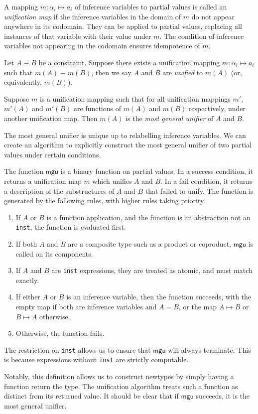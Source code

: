\documentclass[11pt]{book}
\begin{document}
\begin{defn}
  A mapping \( m: \alpha_i \mapsto a_i \) of inference variables to partial values is called an \textit{unification map} if the inference variables in the domain of \( m \) do not appear anywhere in its codomain.
  They can be applied to partial values, replacing all instances of that variable with their value under \( m \).
  The condition of inference variables not appearing in the codomain ensures idempotence of \( m \).

  Let \( A \equiv B \) be a constraint.
  Suppose there exists a unification mapping \( m: \alpha_i \mapsto a_i \) such that \( m(A) \equiv m(B) \), then we say \( A \) and \( B \) are \textit{unified} to \( m(A) \) (or, equivalently, \( m(B) \)).

  Suppose \( m \) is a unification mapping such that for all unification mappings \( m' \), \( m'(A) \) and \( m'(B) \) are functions of \( m(A) \) and \( m(B) \) respectively, under another unification map.
  Then \( m(A) \) is the \textit{most general unifier} of \( A \) and \( B \).
\end{defn}
The most general unifier is unique up to relabelling inference variables.
We can create an algorithm to explicitly construct the most general unifier of two partial values under certain conditions.
\begin{defn}
  The function \( \mathsf{mgu} \) is a binary function on partial values.
  In a success condition, it returns a unification map \( m \) which unifies \( A \) and \( B \).
  In a fail condition, it returns a description of the substructures of \( A \) and \( B \) that failed to unify.
  The function is generated by the following rules, with higher rules taking priority.
  \begin{enumerate}
    \item If \( A \) or \( B \) is a function application, and the function is an abstraction not an \lstinline{inst}, the function is evaluated first.
    \item If both \( A \) and \( B \) are a composite type such as a product or coproduct, \( \mathsf{mgu} \) is called on its components.
    \item If \( A \) and \( B \) are \lstinline{inst} expressions, they are treated as atomic, and must match exactly.
    \item If either \( A \) or \( B \) is an inference variable, then the function succeeds, with the empty map if both are inference variables and \( A = B \), or the map \( A \mapsto B \) or \( B \mapsto A \) otherwise.
    \item Otherwise, the function fails.
  \end{enumerate}
  The restriction on \lstinline{inst} allows us to ensure that \( \mathsf{mgu} \) will always terminate.
  This is because expressions without \lstinline{inst} are strictly computable. %
\end{defn}
Notably, this definition allows us to construct newtypes by simply having a function return the type.
The unification algorithm treats such a function as distinct from its returned value.
It should be clear that if \( \mathsf{mgu} \) succeeds, it is the most general unifier.
\end{document}
